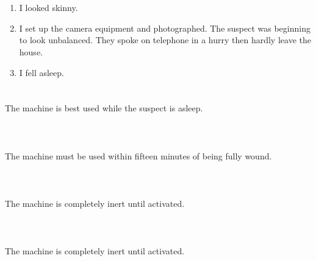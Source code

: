 \documentclass{article}
\begin{document}
    \newpage
    
    \section{}
    
    \begin{enumerate}
    
    \item I looked skinny.\\
    
    \item I set up the camera equipment and photographed. The suspect was beginning to look unbalanced. They spoke on telephone in a hurry then hardly leave the house.\\
    
    \item I fell asleep.\\
    
    \end{enumerate}
     
    \newpage
    
    \section{}
    The machine is best used while the suspect is asleep.\\\\ 
    \newpage
    
    \section{}
    The machine must be used within fifteen minutes of being fully wound.\\\\ 
    \newpage
    
    \section{}
    The machine is completely inert until activated.\\\\ 
    \newpage
    
    \section{}
    The machine is completely inert until activated.\\\\ 
    \newpage
    
\end{document}
